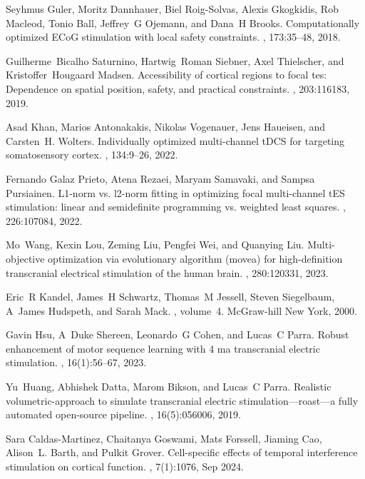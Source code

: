 \begin{thebibliography}{10}
Seyhmus Guler, Moritz Dannhauer, Biel Roig-Solvas, Alexis Gkogkidis, Rob Macleod, Tonio Ball, Jeffrey~G Ojemann, and Dana~H Brooks.
\newblock Computationally optimized {ECoG} stimulation with local safety constraints.
, 173:35--48, 2018.

Guilherme~Bicalho Saturnino, Hartwig~Roman Siebner, Axel Thielscher, and Kristoffer~Hougaard Madsen.
\newblock Accessibility of cortical regions to focal tes: Dependence on spatial position, safety, and practical constraints.
, 203:116183, 2019.

Asad Khan, Marios Antonakakis, Nikolas Vogenauer, Jens Haueisen, and Carsten~H. Wolters.
\newblock Individually optimized multi-channel {tDCS} for targeting somatosensory cortex.
, 134:9--26, 2022.

Fernando {Galaz Prieto}, Atena Rezaei, Maryam Samavaki, and Sampsa Pursiainen.
\newblock L1-norm vs. l2-norm fitting in optimizing focal multi-channel {tES} stimulation: linear and semidefinite programming vs. weighted least squares.
, 226:107084, 2022.

Mo~Wang, Kexin Lou, Zeming Liu, Pengfei Wei, and Quanying Liu.
\newblock Multi-objective optimization via evolutionary algorithm (movea) for high-definition transcranial electrical stimulation of the human brain.
, 280:120331, 2023.

Eric~R Kandel, James~H Schwartz, Thomas~M Jessell, Steven Siegelbaum, A~James Hudspeth, and Sarah Mack.
, volume~4.
\newblock McGraw-hill New York, 2000.

Gavin Hsu, A~Duke Shereen, Leonardo~G Cohen, and Lucas~C Parra.
\newblock Robust enhancement of motor sequence learning with 4 ma transcranial electric stimulation.
, 16(1):56--67, 2023.

Yu~Huang, Abhishek Datta, Marom Bikson, and Lucas~C Parra.
\newblock Realistic volumetric-approach to simulate transcranial electric stimulation—roast—a fully automated open-source pipeline.
, 16(5):056006, 2019.

Sara Caldas-Martinez, Chaitanya Goswami, Mats Forssell, Jiaming Cao, Alison~L. Barth, and Pulkit Grover.
\newblock Cell-specific effects of temporal interference stimulation on cortical function.
, 7(1):1076, Sep 2024.


\end{thebibliography}
